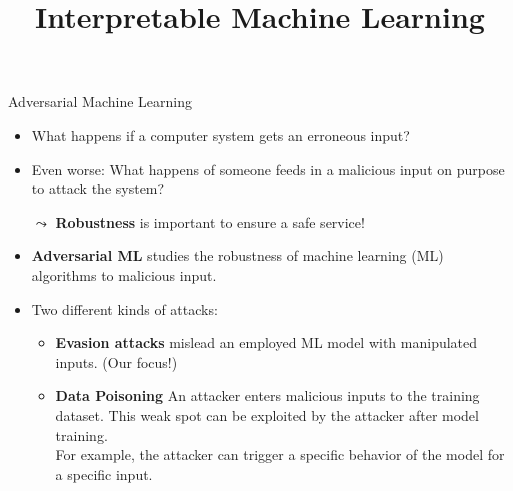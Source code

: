 \documentclass[11pt,compress,t,notes=noshow, aspectratio=169, xcolor=table]{beamer}
\title{Interpretable Machine Learning}
\date{}
\begin{document}
\newcommand{\vertiii}[1]{{\left\vert\kern-0.25ex\left\vert\kern-0.25ex\left\vert #1 
    \right\vert\kern-0.25ex\right\vert\kern-0.25ex\right\vert}}


 \newcommand{\titlefigure}{figure/AEturtle.jpg}
\newcommand{\learninggoals}{
\item Understand the definition of AEs and their relation to Counterfactual Explanations
\item Understand different methods that generate AEs
\item Discuss potential causes of AEs and standard defenses against them}



\begin{frame}[c]{Adversarial Machine Learning}
\begin{itemize}
    \item What happens if a computer system gets an erroneous input?
    \item Even worse: What happens of someone feeds in a malicious input on purpose\\ to attack the system?
    \item[$\leadsto$] \textbf{Robustness} is important to ensure a safe service!
    \medskip
    \item \textbf{Adversarial ML} studies the robustness of machine learning (ML) algorithms to malicious input.
    \item Two different kinds of attacks:
    \begin{itemize}
        \item \textbf{Evasion attacks} mislead an employed ML model with manipulated inputs. (Our focus!)
        \item \textbf{Data Poisoning} An attacker enters malicious inputs to the training dataset. This weak spot can be exploited by the attacker after model training.\\ For example, the attacker can trigger a specific behavior of the model for a specific input. 
    \end{itemize}
    \end{itemize}
\end{frame}
\end{document}
